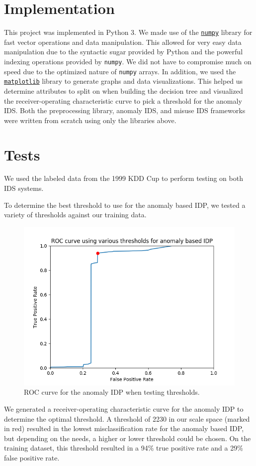 \documentclass[letterpaper,12pt]{article}
\begin{document}
\section*{Implementation}
This project was implemented in Python 3. We made use of the
\href{http://www.numpy.org/}{\texttt{numpy}}
library for fast vector operations and data manipulation. This allowed for
very easy data manipulation due to the syntactic sugar provided by Python and
the powerful indexing operations provided by \texttt{numpy}. We did not have to
compromise much on speed due to the optimized nature of \texttt{numpy} arrays.
In addition, we used the \href{https://matplotlib.org/}{\texttt{matplotlib}}
library to generate graphs and data visualizations. This helped us determine
attributes to split on when building the decision tree and visualized the
receiver-operating characteristic curve to pick a threshold for the anomaly
IDS. Both the preprocessing library, anomaly IDS, and misuse IDS frameworks were
written from scratch using only the libraries above.

\section*{Tests}
We used the labeled data from the 1999 KDD Cup to perform testing on both IDS
systems.

To determine the best threshold to use for the anomaly based IDP, we tested a
variety of thresholds against our training data.
\begin{figure}[H]
  \centering
  \includegraphics[width=12cm]{anomaly_roc.png}
  \caption{ROC curve for the anomaly IDP when testing thresholds.}
\end{figure}
We generated a receiver-operating characteristic curve for the anomaly IDP to
determine the optimal threshold. A threshold of 2230 in our scale space (marked
in red) resulted in the lowest misclassification rate for the anomaly based
IDP, but depending on the needs, a higher or lower threshold could be chosen. On
the training dataset, this threshold resulted in a 94\% true positive rate and
a 29\% false positive rate.
\end{document}
